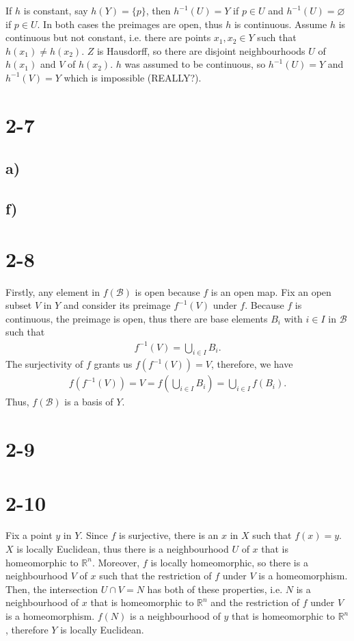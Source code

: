 \documentclass[a4paper]{book}
\theoremstyle{definition}
\begin{document}
If \(h\) is constant, say \(h(Y) = \{p\}\), then \(h^{-1}(U) = Y\) if \(p \in U\) and \(h^{-1}(U) = \varnothing\) if \(p \in U\). In both cases the preimages are open, thus \(h\) is continuous. Assume \(h\) is continuous but not constant, i.e. there are points \(x_1, x_2 \in Y\) such that \(h(x_1) \neq h(x_2)\). \(Z\) is Hausdorff, so there are disjoint neighbourhoods \(U\) of \(h(x_1)\) and \(V\) of \(h(x_2)\). \(h\) was assumed to be continuous, so \(h^{-1}(U) = Y\) and \(h^{-1}(V) = Y\) which is impossible (REALLY?).

\section*{2-7}
\subsection*{a)}


\subsection*{f)}
\section*{2-8}
Firstly, any element in \(f(\mathcal{B})\) is open because \(f\) is an open map. Fix an open subset \(V\) in \(Y\) and consider its preimage \(f^{-1}(V)\) under \(f\). Because \(f\) is continuous, the preimage is open, thus there are base elements \(B_i\) with \(i \in I\) in \(\mathcal{B}\) such that
\begin{align*}
    f^{-1}(V) = \bigcup_{i \in I} B_i \text{.}
\end{align*}
The surjectivity of \(f\) grants us \(f(f^{-1}(V)) = V\), therefore, we have
\begin{align*}
    f(f^{-1}(V)) = V = f \left( \bigcup_{i \in I} B_i \right) = \bigcup_{i \in I} f(B_i)\text{.}
\end{align*}
Thus, \(f(\mathcal{B})\) is a basis of \(Y\).

\section*{2-9}

\section*{2-10}
Fix a point \(y\) in \(Y\). Since \(f\) is surjective, there is an \(x\) in \(X\) such that \(f(x) = y\). \(X\) is locally Euclidean, thus there is a neighbourhood \(U\) of \(x\) that is homeomorphic to \(\mathbb{R}^n\). Moreover, \(f\) is locally homeomorphic, so there is a neighbourhood \(V\) of \(x\) such that the restriction of \(f\) under \(V\) is a homeomorphism. Then, the intersection \(U \cap V = N\) has both of these properties, i.e. \(N\) is a neighbourhood of \(x\) that is homeomorphic to \(\mathbb{R}^n\) and the restriction of \(f\) under \(V\) is a homeomorphism. \(f(N)\) is a neighbourhood of \(y\) that is homeomorphic to \(\mathbb{R}^n\), therefore \(Y\) is locally Euclidean.
\end{document}
